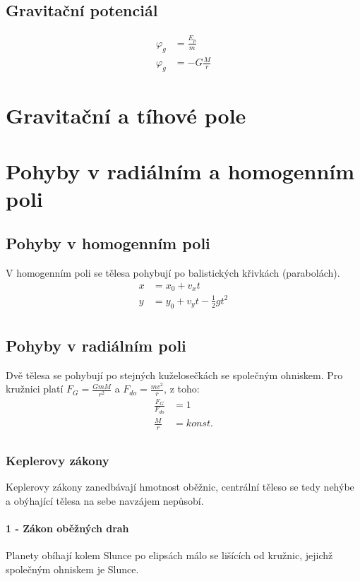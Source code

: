 \documentclass[titlepage]{book}
\begin{document}
\subsection{Gravitační potenciál}
\begin{align}
\varphi _g &= \frac{E_p}{m}\\
\varphi _g &= -G\frac{M}{r}
\end{align}
\section{Gravitační a tíhové pole}
\section{Pohyby v radiálním a homogenním poli}
\subsection{Pohyby v homogenním poli}
V homogenním poli se tělesa pohybují po balistických křivkách (parabolách).\\
\begin{align}
x &= x_0 + v_x t\\
y &= y_0 + v_y t - \frac{1}{2} g t^2\\
\end{align}
\subsection{Pohyby v radiálním poli}
Dvě tělesa se pohybují po stejných kuželosečkách se společným ohniskem. Pro kružnici platí $F_G = \frac{GmM}{r^2}$ a $F_{do} = \frac{mv^2}{r}$, z toho:\\
\begin{align}
\frac{F_G}{F_{do}} &= 1\\
\frac{M}{r} &= konst.\\
\end{align}
\subsubsection{Keplerovy zákony}
Keplerovy zákony zanedbávají hmotnost oběžnic, centrální těleso se tedy nehýbe a obýhající tělesa na sebe navzájem nepůsobí.
\paragraph{1 - Zákon oběžných drah}
Planety obíhají kolem Slunce po elipsách málo se lišících od kružnic, jejichž společným ohniskem je Slunce.
\end{document}
